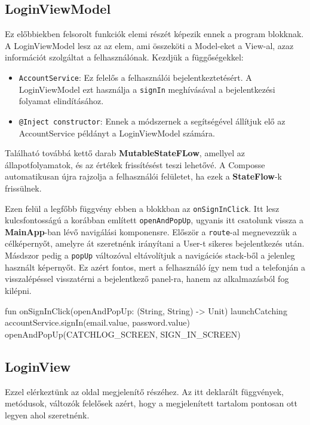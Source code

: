 \subsection{LoginViewModel}
Ez előbbiekben felsorolt funkciók elemi részét képezik ennek a program blokknak. A LoginViewModel lesz az az elem, ami összeköti a Model-eket a View-al, azaz információt szolgáltat a felhasználónak.
Kezdjük a függőségekkel:
\begin{itemize}
    \item \texttt{AccountService}: Ez felelős a felhasználói bejelentkeztetésért. A LoginViewModel ezt használja a \texttt{signIn} meghívásával a bejelentkezési folyamat elindításához.
    \item  \texttt{@Inject constructor}: Ennek a módszernek a segítségével állítjuk elő az AccountService példányt a LoginViewModel számára.
\end{itemize}
Található továbbá kettő darab \textbf{MutableStateFLow}, amellyel az állapotfolyamatok, és az értékek frissítésést teszi lehetővé. A Composse automatikusan újra rajzolja a felhasználói felületet, ha ezek a \textbf{StateFlow}-k frissülnek.

Ezen felül a legfőbb függvény ebben a blokkban az \texttt{onSignInClick}.
Itt lesz kulcsfontosságú a korábban említett \texttt{openAndPopUp}, ugyanis itt csatolunk vissza a \textbf{MainApp}-ban lévő navigálási komponensre. Először a \texttt{route}-al megnevezzük a célképernyőt, amelyre át szeretnénk irányítani a User-t sikeres bejelentkezés után. Másdszor pedig a \texttt{popUp} változóval eltávolítjuk a navigációs stack-ből a jelenleg használt képernyőt. Ez azért fontos, mert a felhasználó így nem tud a telefonján a visszalépéssel visszatérni a bejelentkező panel-ra, hanem az alkalmazásból fog kilépni.
\begin{java}[caption = {onSignInClick függvény.}]
fun onSignInClick(openAndPopUp: (String, String) -> Unit) {
    launchCatching {
        accountService.signIn(email.value, password.value)
        openAndPopUp(CATCHLOG_SCREEN, SIGN_IN_SCREEN)
    }
}
\end{java}

\subsection{LoginView}
Ezzel elérkeztünk az oldal megjelenítő részéhez. Az itt deklarált függvények, metódusok, változók felelősek azért, hogy a megjelenített tartalom pontosan ott legyen ahol szeretnénk.

